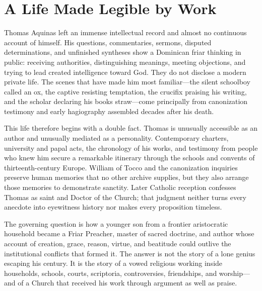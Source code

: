 \section*{A Life Made Legible by Work}

Thomas Aquinas left an immense intellectual record and almost no continuous
account of himself.  His questions, commentaries, sermons, disputed
determinations, and unfinished syntheses show a Dominican friar thinking in
public: receiving authorities, distinguishing meanings, meeting objections,
and trying to lead created intelligence toward God.  They do not disclose a
modern private life.  The scenes that have made him most familiar---the silent
schoolboy called an ox, the captive resisting temptation, the crucifix praising
his writing, and the scholar declaring his books straw---come principally from
canonization testimony and early hagiography assembled decades after his death.

This life therefore begins with a double fact.  Thomas is unusually accessible
as an author and unusually mediated as a personality.  Contemporary charters,
university and papal acts, the chronology of his works, and testimony from
people who knew him secure a remarkable itinerary through the schools and
convents of thirteenth-century Europe.  William of Tocco and the canonization
inquiries preserve human memories that no other archive supplies, but they also
arrange those memories to demonstrate sanctity.  Later Catholic reception
confesses Thomas as saint and Doctor of the Church; that judgment neither turns
every anecdote into eyewitness history nor makes every proposition timeless.

The governing question is how a younger son from a frontier aristocratic
household became a Friar Preacher, master of sacred doctrine, and author whose
account of creation, grace, reason, virtue, and beatitude could outlive the
institutional conflicts that formed it.  The answer is not the story of a lone
genius escaping his century.  It is the story of a vowed religious working
inside households, schools, courts, scriptoria, controversies, friendships,
and worship---and of a Church that received his work through argument as well
as praise.
